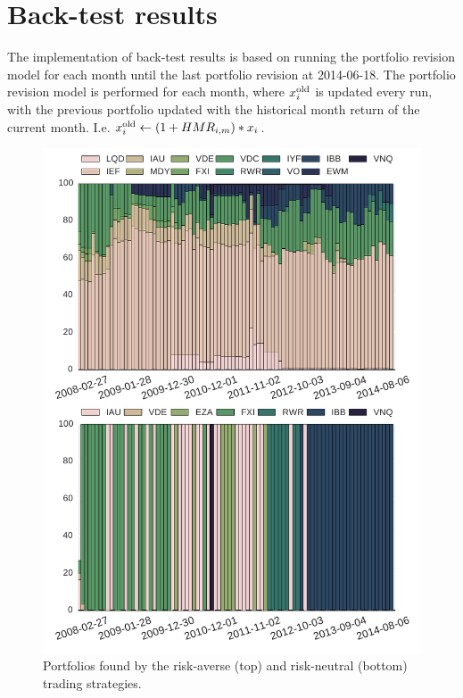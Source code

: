 \section{Back-test results}

The implementation of back-test results is based on running the portfolio revision model for each month until the last portfolio revision at 2014-06-18.
The portfolio revision model is performed for each month, where $x^{\textup{old}}_{i}$ is updated every run, with the previous portfolio updated with the historical month return of the current month.
I.e. $x_i^{\textup{old}} \leftarrow (1 + HMR_{i,m}) * x_i$.

\begin{figure}[tpb]
\centering
\includegraphics[width=1.0\textwidth]{../pic/trading_portfolio.pdf}
\caption{Portfolios found by the risk-averse (top) and risk-neutral (bottom) trading strategies.}
\label{fig:tradingportfolios}
\end{figure}

